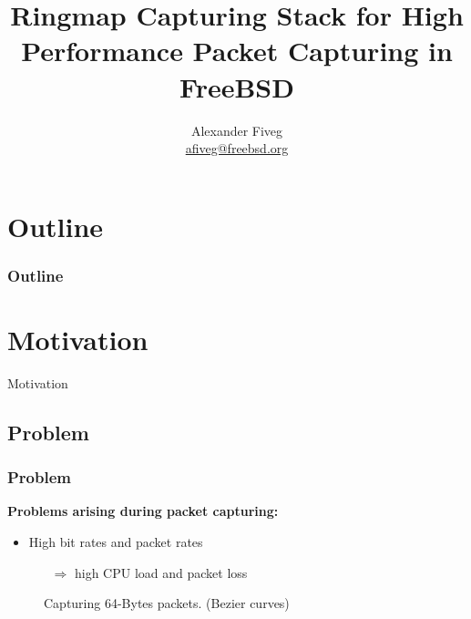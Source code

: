 \documentclass{beamer}
\title{Ringmap Capturing Stack for High Performance Packet Capturing in FreeBSD}
\author[Alexander Fiveg]{ Alexander Fiveg \\
\url{afiveg@freebsd.org} }
\begin{document}
\frame{\titlepage}

\section*{Outline}

\begin{frame}
\frametitle{Outline}
\tableofcontents
\end{frame}




\section{Motivation}

\begin{frame}
	\begin{center}
	\huge{Motivation}
	\end{center}
\end{frame}

\subsection*{Problem}
\begin{frame}
\frametitle{Problem}
\textbf{Problems arising during packet capturing:}
\begin{itemize}
	\item High bit rates and packet rates
		\begin{itemize}
			\item [$\Rightarrow$] high CPU load and packet loss \newline
		\end{itemize}
\end{itemize}
\begin{figure}[H] 
	\caption{Capturing 64-Bytes packets. (Bezier curves)}
\end{figure}
\end{frame}
\end{document}
